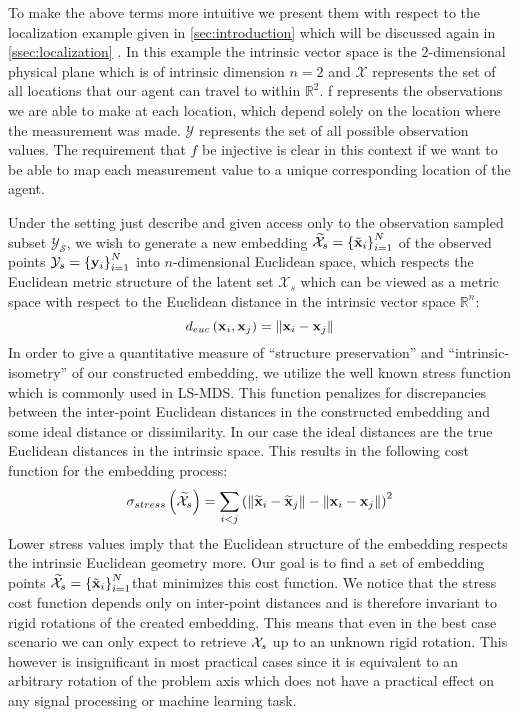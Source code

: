 	To make the above terms more intuitive we present them with respect to the localization example given in \cref{sec:introduction} which will be discussed again in \cref{ssec:localization} . In this example the intrinsic vector space is the $2$-dimensional physical plane which is of intrinsic dimension $n=2$ and $\mathcal{X}$ represents the set of all locations that our agent can travel to within $\mathbb{R}^{2}$. f represents the observations we are able to make at each location, which depend solely on the location where the measurement was made. $\mathcal{Y}$ represents the set of all possible observation values. The requirement that $f$ be injective is clear in this context if we want to be able to map each measurement value to a unique corresponding location of the agent. 
		
	Under the setting just describe and given access only to the observation sampled subset $\mathcal{Y_{S}}$, we wish to generate a new embedding ${\cal \widetilde{X}}_{s}=\left\{ \tilde{{\bf x}}_{i}\right\} _{i=1}^{N}$ of the observed points ${\cal Y}_{s}=\left\{ {\bf y}_{i}\right\} _{i=1}^{N}$ into $n$-dimensional Euclidean space, which respects the Euclidean metric structure of the latent set $\mathcal{X}_{s}$ which can be viewed as a metric space with respect to the Euclidean distance in the intrinsic vector space $\mathbb{R}^{n}$:
	\[
	d_{euc}\left(\text{\ensuremath{\mathbf{x}}}_{i},\text{\ensuremath{\mathbf{x}}}_{j}\right)=\left\Vert {\bf x}_{i}-{\bf x}_{j}\right\Vert 
	\]	
	In order to give a quantitative measure of ``structure preservation'' and ``intrinsic-isometry'' of our constructed embedding, we utilize the well known stress function which is commonly used in \ac{LS-MDS}. This function penalizes for discrepancies between the inter-point Euclidean distances in the constructed embedding and some ideal distance or dissimilarity. In our case the ideal distances are the true Euclidean distances in the intrinsic space. This results in the following cost function for the embedding process:
	\begin{equation}
	\sigma_{stress}\left({\cal \widetilde{X}}_{s}\right)=\sum_{i<j}\left(\left\Vert \mathbf{\widetilde{x}}_{i}-\mathbf{\widetilde{x}}_{j}\right\Vert -\left\Vert {\bf x}_{i}-{\bf x}_{j}\right\Vert \right)^{2}\label{eq:stress}
	\end{equation}
	Lower stress values imply that the Euclidean structure of the embedding respects the intrinsic Euclidean geometry more. Our goal is to find a set of embedding points ${\cal \widetilde{X}}_{s}=\left\{ \tilde{{\bf x}}_{i}\right\} _{i=1}^{N}$that minimizes this cost function. We notice that the stress cost function depends only on inter-point distances and is therefore invariant to rigid rotations of the created embedding. This means that even in the best case scenario we can only expect to retrieve ${\cal X}_{s}$ up to an unknown rigid rotation. This however is insignificant in most practical cases since it is equivalent to an arbitrary rotation of the problem axis which does not have a practical effect on any signal processing or machine learning task.
